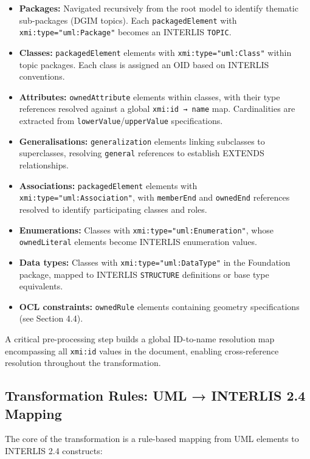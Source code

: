 \documentclass[conference]{IEEEtran}
\begin{document}
\begin{itemize}[leftmargin=*]
\item \textbf{Packages:} Navigated recursively from the root model to identify thematic sub-packages (DGIM topics). Each \texttt{packagedElement} with \texttt{xmi:type="uml:Package"} becomes an INTERLIS \texttt{TOPIC}.
\item \textbf{Classes:} \texttt{packagedElement} elements with \texttt{xmi:type="uml:Class"} within topic packages. Each class is assigned an OID based on INTERLIS conventions.
\item \textbf{Attributes:} \texttt{ownedAttribute} elements within classes, with their type references resolved against a global \texttt{xmi:id → name} map. Cardinalities are extracted from \texttt{lowerValue}/\texttt{upperValue} specifications.
\item \textbf{Generalisations:} \texttt{generalization} elements linking subclasses to superclasses, resolving \texttt{general} references to establish EXTENDS relationships.
\item \textbf{Associations:} \texttt{packagedElement} elements with \texttt{xmi:type="uml:Association"}, with \texttt{memberEnd} and \texttt{ownedEnd} references resolved to identify participating classes and roles.
\item \textbf{Enumerations:} Classes with \texttt{xmi:type="uml:Enumeration"}, whose \texttt{ownedLiteral} elements become INTERLIS enumeration values.
\item \textbf{Data types:} Classes with \texttt{xmi:type="uml:DataType"} in the Foundation package, mapped to INTERLIS \texttt{STRUCTURE} definitions or base type equivalents.
\item \textbf{OCL constraints:} \texttt{ownedRule} elements containing geometry specifications (see Section 4.4).
\end{itemize}

A critical pre-processing step builds a global ID-to-name resolution map encompassing all \texttt{xmi:id} values in the document, enabling cross-reference resolution throughout the transformation.

\subsection{Transformation Rules: UML → INTERLIS 2.4 Mapping}

The core of the transformation is a rule-based mapping from UML elements to INTERLIS 2.4 constructs:
\end{document}
